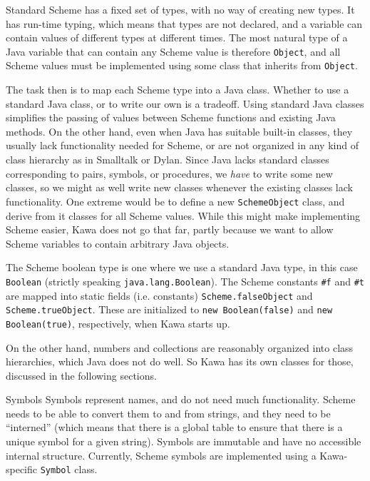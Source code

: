 \documentclass[twocolumn]{article}
\makeatletter
\def\section{\@startsection {section}{1}{\z@}
   {14pt plus 2pt minus 2pt}{12pt plus 2pt minus 2pt} {\large\bf}}
\makeatother
\begin{document}
Standard Scheme \cite{R4RS} has a fixed set of types, with no way of creating
new types.  It has run-time typing, which means that types are not declared,
and a variable can contain values of different types at different times.
The most natural type of a Java variable that can contain any
Scheme value is therefore {\tt Object}, and all
Scheme values must be implemented using some class that
inherits from {\tt Object}.


The task then is to map each Scheme type into a Java class.
Whether to use a standard Java class, or to write our own
is a tradeoff.  Using standard Java classes simplifies
the passing of values between Scheme functions and existing Java methods.
On the other hand, even when Java has suitable built-in classes,
they usually lack functionality needed for Scheme, or are not organized
in any kind of class hierarchy as in Smalltalk or Dylan.
Since Java lacks standard classes corresponding to pairs,
symbols, or procedures, we \emph{have} to write some new
classes, so we might as well write new classes whenever the
existing classes lack functionality.  One extreme would
be to define a new {\tt SchemeObject} class, and derive from
it classes for all Scheme values.  While this might make
implementing Scheme easier, Kawa does not go that far,
partly because we want to allow Scheme variables to contain
arbitrary Java objects.

The Scheme boolean type is one where we use a standard Java type,
in this case {\tt Boolean} (strictly speaking {\tt java.lang.Boolean}).
The Scheme constants \verb'#f' and \verb'#t' are mapped into
static fields (i.e. constants) {\tt Scheme.falseObject} and
{\tt Scheme.trueObject}.  These are initialized to {\tt new Boolean(false)}
and {\tt new Boolean(true)}, respectively, when Kawa starts up.

On the other hand, numbers and collections are reasonably organized
into class hierarchies, which Java does not do well.
So Kawa has its own classes for those, discussed in the following sections.

\section{Symbols}
Symbols represent names, and do not need much functionality.
Scheme needs to be able to convert them to and from strings,
and they need to be ``interned'' (which means that there is a global
table to ensure that there is a unique symbol for a given string).
Symbols are immutable and have no accessible internal structure.
Currently, Scheme symbols are implemented using a Kawa-specific
{\tt Symbol} class.
\end{document}
